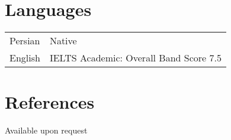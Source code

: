 \documentclass[11pt, a4paper]{article}
\newcommand{\TablePad}{\vspace{-0.4cm}}
\begin{document}
\section{Languages}
\TablePad
\begin{tabularx}{\textwidth}{@{}p{} p{}@{}}
  Persian & Native
  \\
  English & IELTS Academic: Overall Band Score 7.5
\end{tabularx}
\section{References}
Available upon request
\end{document}
